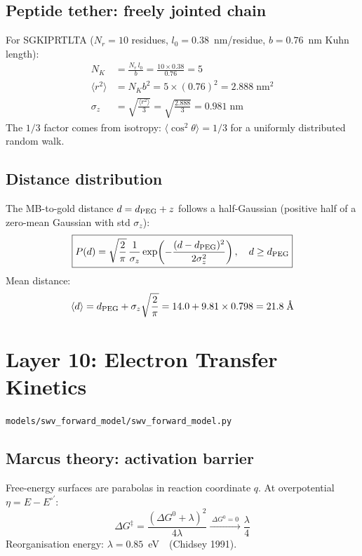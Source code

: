 \documentclass[10pt,a4paper]{article}
\numberwithin{equation}{section}
\newcommand{\CONF}{\textcolor{teal}{\checkmark}}
\newcommand{\file}[1]{\texttt{\small #1}}
\begin{document}
\subsection{Peptide tether: freely jointed chain}

For SGKIPRTLTA ($N_r = 10$ residues, $l_0 = 0.38$~nm/residue, $b = 0.76$~nm Kuhn length):
\begin{align}
  N_K &= \frac{N_r\,l_0}{b} = \frac{10\times0.38}{0.76} = 5 \\
  \langle r^2\rangle &= N_K b^2 = 5\times(0.76)^2 = 2.888\;\text{nm}^2 \\
  \sigma_z &= \sqrt{\frac{\langle r^2\rangle}{3}} = \sqrt{\frac{2.888}{3}} = 0.981\;\text{nm}
\end{align}
The $1/3$ factor comes from isotropy: $\langle\cos^2\theta\rangle = 1/3$ for
a uniformly distributed random walk.

\subsection{Distance distribution}

The MB-to-gold distance $d = d_{\rm PEG} + z$ follows a half-Gaussian
(positive half of a zero-mean Gaussian with std $\sigma_z$):
\begin{equation}
  \boxed{P(d) = \sqrt{\frac{2}{\pi}}\,\frac{1}{\sigma_z}
  \exp\!\left(-\frac{(d-d_{\rm PEG})^2}{2\sigma_z^2}\right),\quad d \geq d_{\rm PEG}}
\end{equation}
Mean distance:
\begin{equation}
  \langle d\rangle = d_{\rm PEG} + \sigma_z\sqrt{\frac{2}{\pi}}
  = 14.0 + 9.81\times0.798 = 21.8\;\text{\AA}
\end{equation}

\section{Layer 10: Electron Transfer Kinetics}
\file{models/swv\_forward\_model/swv\_forward\_model.py}

\subsection{Marcus theory: activation barrier}

Free-energy surfaces are parabolas in reaction coordinate $q$.
At overpotential $\eta = E - E^{\circ\prime}$:
\begin{equation}
  \Delta G^\ddagger = \frac{(\Delta G^0 + \lambda)^2}{4\lambda}
  \xrightarrow{\;\Delta G^0 = 0\;} \frac{\lambda}{4}
\end{equation}
Reorganisation energy: $\lambda = 0.85$~eV~\CONF\ (Chidsey 1991).
\end{document}

